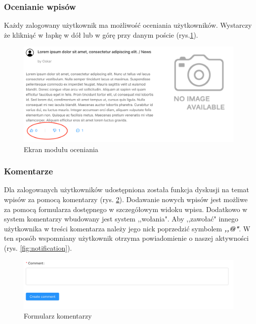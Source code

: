 \documentclass[declaration,shortabstract]{iithesis}
\begin{document}
\subsubsection{Ocenianie wpisów}
Każdy zalogowany użytkownik ma możliwość oceniania użytkowników. Wystarczy że klikniąć w łapkę w dół lub w górę przy danym poście (rys.\ref{fig:like}). 
\begin{figure}
    \centering
    \includegraphics[width=\linewidth]{images/like.png}
    \caption{Ekran modułu oceniania}
    \label{fig:like}
\end{figure}

\subsubsection{Komentarze}
Dla zalogowanych użytkowników udostępniona została funkcja dyskusji na temat wpisów za pomocą komentarzy (rys. \ref{fig:comment}). Dodawanie nowych wpisów jest możliwe za pomocą formularza dostępnego w szczegółowym widoku wpisu. Dodatkowo w system komentarzy wbudowany jest system ,,wołania". Aby ,,zawołać" innego użytkownika w treści komentarza należy jego nick poprzedzić symbolem \textbf{\textit{,,@"}}. W ten sposób wspomniany użytkownik otrzyma powiadomienie o naszej aktywności (rys. \ref{fig:notification}).

\begin{figure}
    \centering
    \includegraphics[width=\linewidth]{images/komentarz.png}
    \caption{Formularz komentarzy}
    \label{fig:comment}
\end{figure}
\end{document}
